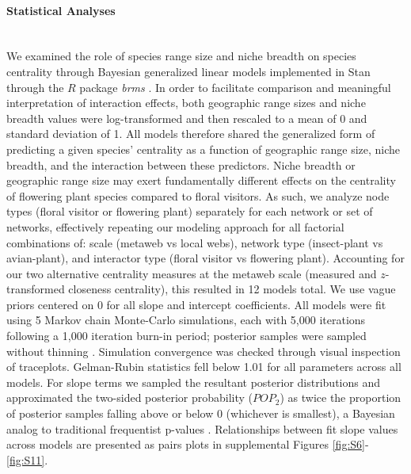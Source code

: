 \paragraph*{Statistical Analyses}\mbox{}\\ 
We examined the role of species range size and niche breadth on species centrality through Bayesian generalized linear models implemented in Stan \parencite{carpenter2017stan} through the $R$ package \textit{brms} \parencite{burkner2017brms}. In order to facilitate comparison and meaningful interpretation of interaction effects, both geographic range sizes and niche breadth values were log-transformed and then rescaled to a mean of 0 and standard deviation of 1. All models therefore shared the generalized form of predicting a given species' centrality as a function of geographic range size, niche breadth, and the interaction between these predictors. Niche breadth or geographic range size may exert fundamentally different effects on the centrality of flowering plant species compared to floral visitors. As such, we analyze node types (floral visitor or flowering plant) separately for each network or set of networks, effectively repeating our modeling approach for all factorial combinations of: scale (metaweb vs local webs), network type (insect-plant vs avian-plant), and interactor type (floral visitor vs flowering plant). Accounting for our two alternative centrality measures at the metaweb scale (measured and $z$-transformed closeness centrality), this resulted in 12 models total. We use vague priors centered on 0 for all slope and intercept coefficients. All models were fit using 5 Markov chain Monte-Carlo simulations, each with 5,000 iterations following a 1,000 iteration burn-in period; posterior samples were sampled without thinning \parencite{link2012thinning}. Simulation convergence was checked through visual inspection of traceplots. Gelman-Rubin statistics fell below 1.01 for all parameters across all models.  For slope terms we sampled the resultant posterior distributions and approximated the two-sided posterior probability ($POP_2$) as twice the proportion of posterior samples falling above or below 0 (whichever is smallest), a Bayesian analog to traditional frequentist p-values \parencite{shi2021reconnecting}. Relationships between fit slope values across models are presented as pairs plots in supplemental Figures \ref{fig:S6}-\ref{fig:S11}. 

